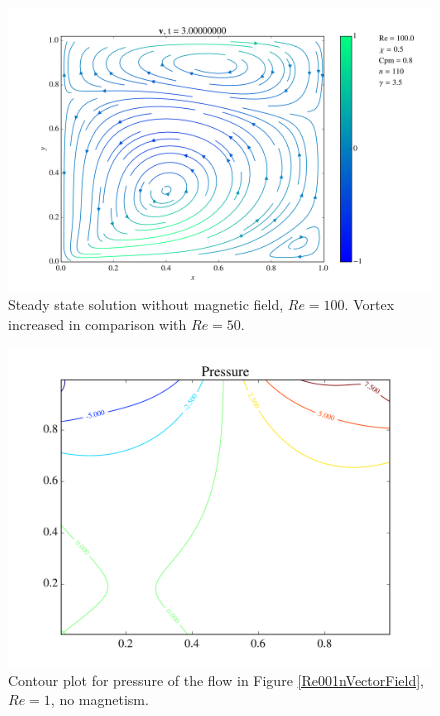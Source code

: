 \documentclass[journal]{IEEEtran}
\begin{document}
\begin{figure}[!t]
\centering
\includegraphics[width=\linewidth]{figures/Re100/w/vectorField}
\caption{Steady state solution without magnetic field, $\mathit{Re}=100$. Vortex increased in comparison with $\mathit{Re} = 50$. \label{Re100wVectorField}}
\end{figure}


\begin{figure}[!t]
\centering
\includegraphics[width=\linewidth]{figures/Re001/n/pressure}
\caption{Contour plot for pressure of the flow in Figure \ref{Re001nVectorField}, $\mathit{Re}=1$, no magnetism. \label{Re001nPressure}}
\end{figure}
\end{document}
